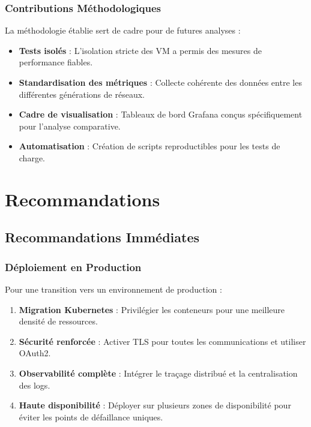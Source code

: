 \documentclass[12pt,a4paper]{report}
\begin{document}
\subsubsection{Contributions Méthodologiques}

La méthodologie établie sert de cadre pour de futures analyses :

\begin{itemize}
    \item \textbf{Tests isolés} : L'isolation stricte des VM a permis des mesures de performance fiables.
    \item \textbf{Standardisation des métriques} : Collecte cohérente des données entre les différentes générations de réseaux.
    \item \textbf{Cadre de visualisation} : Tableaux de bord Grafana conçus spécifiquement pour l'analyse comparative.
    \item \textbf{Automatisation} : Création de scripts reproductibles pour les tests de charge.
\end{itemize}

\section{Recommandations}

\subsection{Recommandations Immédiates}

\subsubsection{Déploiement en Production}

Pour une transition vers un environnement de production :

\begin{enumerate}
    \item \textbf{Migration Kubernetes} : Privilégier les conteneurs pour une meilleure densité de ressources.
    \item \textbf{Sécurité renforcée} : Activer TLS pour toutes les communications et utiliser OAuth2.
    \item \textbf{Observabilité complète} : Intégrer le traçage distribué et la centralisation des logs.
    \item \textbf{Haute disponibilité} : Déployer sur plusieurs zones de disponibilité pour éviter les points de défaillance uniques.
\end{enumerate}
\end{document}
